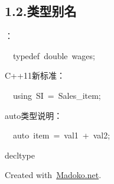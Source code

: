 \documentclass{article}
\begin{document}
{\subsection{1.2.\hspace*{0.5em}类型别名}\label{section}%

：%
\begin{mdpre}%
\noindent~~{typedef}~{double}~wages;%
\end{mdpre}\noindent C++11新标准：
\begin{mdpre}%
\noindent~~{using}~{SI}~=~{Sales\_item};%
\end{mdpre}\noindent auto类型说明：
\begin{mdpre}%
\noindent~~{auto}~item~=~val1~+~val2;%
\end{mdpre}\noindent decltype

\begin{mdbmargintb}{4em}{}%
\begin{mdflushright}%
{\tiny Created with~\href{https://www.madoko.net}{Madoko.net}.}%
\end{mdflushright}%
\end{mdbmargintb}%
}%
\end{document}
